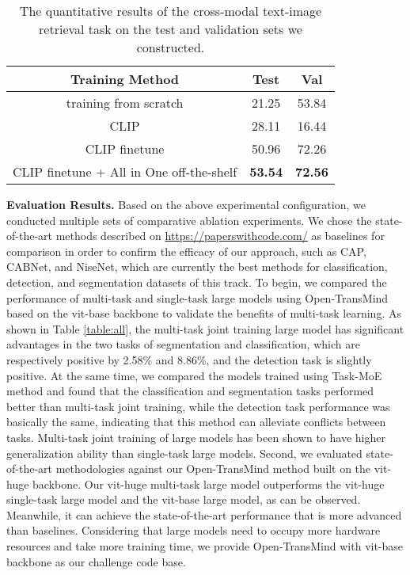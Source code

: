 \documentclass[10pt,twocolumn,letterpaper]{article}
\begin{document}
\begin{table}[t]
\centering
\begin{tabular}{c|cc}
\hline
Training Method                                  & Test & Val \\ \hline
training from scratch                      & 21.25 & 53.84  \\ 
CLIP                                    & 28.11 & 16.44  \\ 
CLIP finetune                           & 50.96 & 72.26  \\ 
CLIP finetune + All in One off-the-shelf & \textbf{53.54} & \textbf{72.56}  
\\ \hline
\end{tabular}
\caption{The quantitative results of the cross-modal text-image retrieval task on the test and validation sets we constructed.}
\label{table:track2_results}
\end{table}


\textbf{Evaluation Results.}
Based on the above experimental configuration, we conducted multiple sets of comparative ablation experiments. We chose the state-of-the-art methods described on \url{https://paperswithcode.com/} as baselines for comparison in order to confirm the efficacy of our approach, such as CAP, CABNet, and NiseNet, which are currently the best methods for classification, detection, and segmentation datasets of this track. To begin, we compared the performance of multi-task and single-task large models using Open-TransMind based on the vit-base backbone to validate the benefits of multi-task learning. As shown in Table \ref{table:all}, the multi-task joint training large model has significant advantages in the two tasks of segmentation and classification, which are respectively positive by 2.58\% and 8.86\%, and the detection task is slightly positive. At the same time, we compared the models trained using Task-MoE method and found that the classification and segmentation tasks performed better than multi-task joint training, while the detection task performance was basically the same, indicating that this method can alleviate conflicts between tasks. Multi-task joint training of large models has been shown to have higher generalization ability than single-task large models.
Second, we evaluated state-of-the-art methodologies against our Open-TransMind method built on the vit-huge backbone. Our vit-huge multi-task large model outperforms the vit-huge single-task large model and the vit-base large model, as can be observed. Meanwhile, it can achieve the state-of-the-art performance that is more advanced than baselines. Considering that large models need to occupy more hardware resources and take more training time, we provide Open-TransMind with vit-base backbone as our challenge code base.
\end{document}
